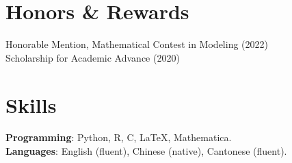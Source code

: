 \documentclass[letterpaper,11pt]{article}
\begin{document}
\section{Honors \& Rewards}
    \begin{itemize}[leftmargin=0.15in, label={}]
    \small{\item{
    Honorable Mention, Mathematical Contest in Modeling (2022) \\
    Scholarship for Academic Advance (2020) \\
    }}
 \end{itemize}
 \vspace{-16pt}

\section{Skills}
 \begin{itemize}[leftmargin=0.15in, label={}]
    \small{\item{
     \textbf{Programming}{: Python, R, C, \LaTeX, Mathematica.} \\
     \textbf{Languages}{: English (fluent), Chinese (native), Cantonese (fluent).} \\
    }}
 \end{itemize}

 
\end{document}
